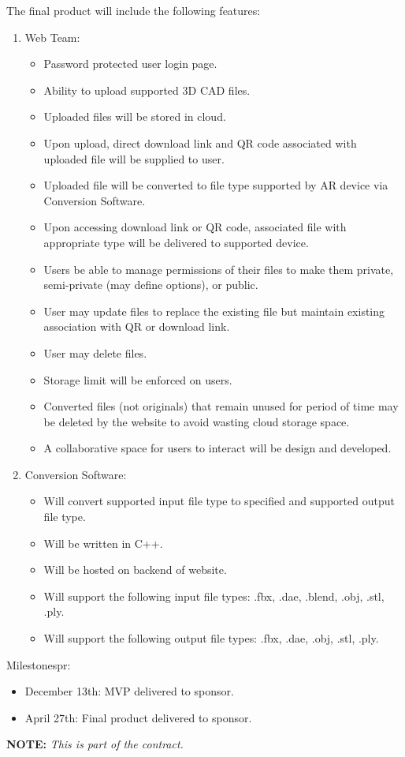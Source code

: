 % 




The final product will include the following features:

\begin{enumerate}
	\item Web Team:
	\begin{itemize}
		\item Password protected user login page. 
		\item Ability to upload supported 3D CAD files. 
		\item Uploaded files will be stored in cloud.
		\item Upon upload, direct download link and QR code associated with uploaded file will be supplied to user. 
		\item Uploaded file will be converted to file type supported by AR device via Conversion Software. 
		\item Upon accessing download link or QR code, associated file with appropriate type will be delivered to supported device. 
		\item Users be able to manage permissions of their files to make them private, semi-private (may define options), or public.
		\item User may update files to replace the existing file but maintain existing association with QR or download link.
		\item User may delete files. 
		\item Storage limit will be enforced on users. 
		\item Converted files (not originals) that remain unused for period of time may be deleted by the website to avoid wasting cloud storage space.  
		\item A collaborative space for users to interact will be design and developed. 
	\end{itemize}
	\item Conversion Software:
	\begin{itemize}
		\item Will convert supported input file type to specified and supported output file type. 
		\item Will be written in C++. 
		\item Will be hosted on backend of website. 
		\item Will support the following input file types: .fbx, .dae, .blend, .obj, .stl, .ply.
		\item Will support the following output file types: .fbx, .dae, .obj, .stl, .ply.
	\end{itemize} 
\end{enumerate}

Milestonespr:

\begin{itemize}
	\item December 13th: MVP delivered to sponsor. 
	\item April 27th: Final product delivered to sponsor.
\end{itemize}


\vspace{2\baselineskip}
\centerline{\Large {\bf NOTE:} {\em This is part of the contract.}}

